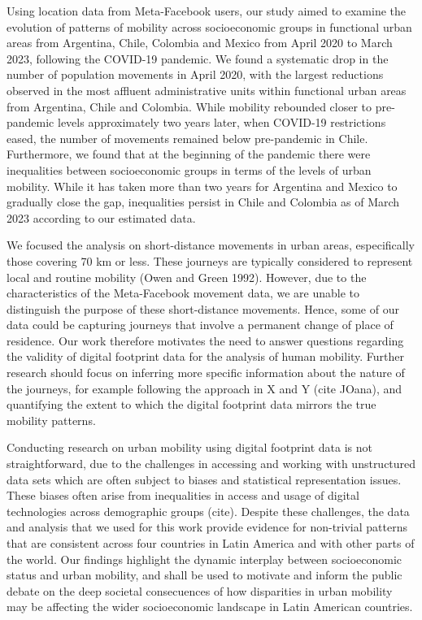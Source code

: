 \documentclass[
  11pt,
]{article}
\begin{document}
Using location data from Meta-Facebook users, our study aimed to examine
the evolution of patterns of mobility across socioeconomic groups in
functional urban areas from Argentina, Chile, Colombia and Mexico from
April 2020 to March 2023, following the COVID-19 pandemic. We found a
systematic drop in the number of population movements in April 2020,
with the largest reductions observed in the most affluent administrative
units within functional urban areas from Argentina, Chile and Colombia.
While mobility rebounded closer to pre-pandemic levels approximately two
years later, when COVID-19 restrictions eased, the number of movements
remained below pre-pandemic in Chile. Furthermore, we found that at the
beginning of the pandemic there were inequalities between socioeconomic
groups in terms of the levels of urban mobility. While it has taken more
than two years for Argentina and Mexico to gradually close the gap,
inequalities persist in Chile and Colombia as of March 2023 according to
our estimated data.

We focused the analysis on short-distance movements in urban areas,
especifically those covering 70 km or less. These journeys are typically
considered to represent local and routine mobility (Owen and Green
1992). However, due to the characteristics of the Meta-Facebook movement
data, we are unable to distinguish the purpose of these short-distance
movements. Hence, some of our data could be capturing journeys that
involve a permanent change of place of residence. Our work therefore
motivates the need to answer questions regarding the validity of digital
footprint data for the analysis of human mobility. Further research
should focus on inferring more specific information about the nature of
the journeys, for example following the approach in X and Y (cite
JOana), and quantifying the extent to which the digital footprint data
mirrors the true mobility patterns.

Conducting research on urban mobility using digital footprint data is
not straightforward, due to the challenges in accessing and working with
unstructured data sets which are often subject to biases and statistical
representation issues. These biases often arise from inequalities in
access and usage of digital technologies across demographic groups
(cite). Despite these challenges, the data and analysis that we used for
this work provide evidence for non-trivial patterns that are consistent
across four countries in Latin America and with other parts of the
world. Our findings highlight the dynamic interplay between
socioeconomic status and urban mobility, and shall be used to motivate
and inform the public debate on the deep societal consecuences of how
disparities in urban mobility may be affecting the wider socioeconomic
landscape in Latin American countries.
\end{document}
